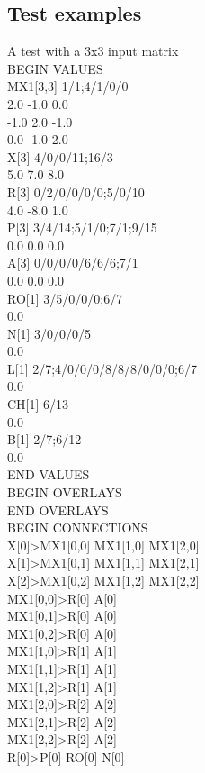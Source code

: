 \documentclass[12pt,a4paper]{article}
\begin{document}
\subsection{Test examples}
A test with a 3x3 input matrix\\
BEGIN VALUES\\
MX1[3,3] 1/1;4/1/0/0\\
2.0 -1.0 0.0\\
-1.0 2.0 -1.0\\
0.0 -1.0 2.0\\
X[3] 4/0/0/11;16/3\\
5.0 7.0 8.0\\
R[3] 0/2/0/0/0/0;5/0/10\\
4.0 -8.0 1.0\\
P[3] 3/4/14;5/1/0;7/1;9/15\\
0.0 0.0 0.0\\
A[3] 0/0/0/0/6/6/6;7/1\\
0.0 0.0 0.0\\
RO[1] 3/5/0/0/0;6/7\\
0.0\\
N[1] 3/0/0/0/5\\
0.0\\
L[1] 2/7;4/0/0/0/8/8/8/0/0/0;6/7\\
0.0\\
CH[1] 6/13\\
0.0\\
B[1] 2/7;6/12\\
0.0\\
END VALUES\\
BEGIN OVERLAYS\\
END OVERLAYS\\
BEGIN CONNECTIONS\\
X[0]>MX1[0,0] MX1[1,0] MX1[2,0]\\
X[1]>MX1[0,1] MX1[1,1] MX1[2,1]\\
X[2]>MX1[0,2] MX1[1,2] MX1[2,2]\\
MX1[0,0]>R[0] A[0]\\
MX1[0,1]>R[0] A[0]\\
MX1[0,2]>R[0] A[0]\\
MX1[1,0]>R[1] A[1]\\
MX1[1,1]>R[1] A[1]\\
MX1[1,2]>R[1] A[1]\\
MX1[2,0]>R[2] A[2]\\
MX1[2,1]>R[2] A[2]\\
MX1[2,2]>R[2] A[2]\\
R[0]>P[0] RO[0] N[0]\\
\end{document}
